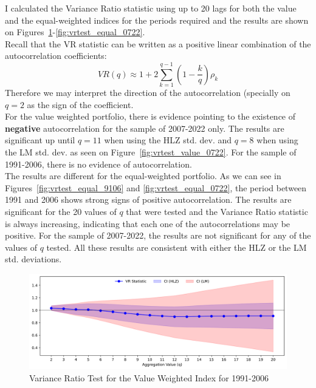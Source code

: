 \documentclass[12pt,twoside]{article}
\begin{document}
\begin{solution}
    I calculated the Variance Ratio statistic using up to 20 lags for both the value and the equal-weighted indices for the periods required and the results are shown on Figures~\ref{fig:vrtest_value_9106}-\ref{fig:vrtest_equal_0722}. \\
    Recall that the VR statistic can be written as a positive linear combination of the autocorrelation coefficients:
    \[
        VR(q) \approx 1 + 2\sum_{k=1}^{q-1} \left(1-\frac{k}{q}\right) \rho_k
    \]
    Therefore we may interpret the direction of the autocorrelation (specially on \(q=2\) as the sign of the coefficient. \\
    For the value weighted portfolio, there is evidence pointing to the existence of \textbf{negative} autocorrelation for the sample of 2007-2022 only. The results are significant up until \(q = 11\) when using the HLZ std. dev. and \(q=8\) when using the LM std. dev. as seen on Figure~\ref{fig:vrtest_value_0722}. For the sample of 1991-2006, there is no evidence of autocorrelation. \\
    The results are different for the equal-weighted portfolio. As we can see in Figures~\ref{fig:vrtest_equal_9106} and \ref{fig:vrtest_equal_0722}, the period between 1991 and 2006 shows strong signs of positive autocorrelation. The results are significant for the 20 values of \(q\) that were tested and the Variance Ratio statistic is always increasing, indicating that each one of the autocorrelations may be positive. For the sample of 2007-2022, the results are not significant for any of the values of \(q\) tested. All these results are consistent with either the HLZ or the LM std. deviations.\\
    \begin{figure}[!htbp]
        \centering
        \caption{Variance Ratio Test for the Value Weighted Index for 1991-2006}
        \label{fig:vrtest_value_9106}
        \includegraphics[width=1\textwidth]{images/vrtest_value_9106.png}
    \end{figure}

\end{solution}
\end{document}

